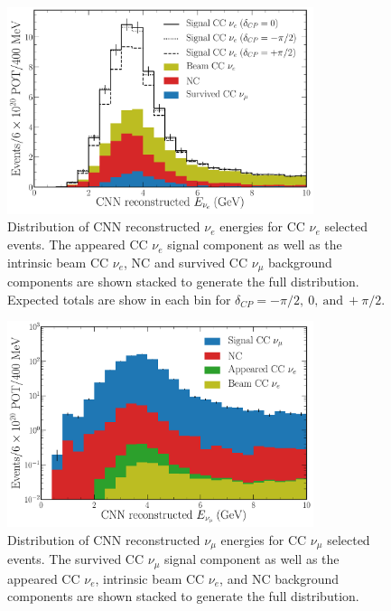 \begin{figure} %
    \includegraphics[width=0.8\textwidth]{diagrams/7-results/final_nuel_passed_energy_dist.pdf}
    \caption[Distribution of CNN reconstructed $\nu_{e}$ energies for CC $\nu_{e}$ selected events]
    {Distribution of CNN reconstructed $\nu_{e}$ energies for CC $\nu_{e}$ selected events. The
        appeared CC $\nu_{e}$ signal component as well as the intrinsic beam CC $\nu_{e}$, NC and
        survived CC $\nu_{\mu}$ background components are shown stacked to generate the full
        distribution. Expected totals are show in each bin for
        $\delta_{CP}=-\pi/2,~0,~\text{and}~+\pi/2$.}
    \label{fig:final_nuel_passed_energy_dist}
\end{figure}

\begin{figure} %
    \includegraphics[width=0.8\textwidth]{diagrams/7-results/final_numu_passed_energy_dist.pdf}
    \caption[Distribution of CNN reconstructed $\nu_{\mu}$ energies for CC $\nu_{\mu}$ selected
        events] {Distribution of CNN reconstructed $\nu_{\mu}$ energies for CC $\nu_{\mu}$
        selected events. The survived CC $\nu_{\mu}$ signal component as well as the appeared CC
        $\nu_{e}$, intrinsic beam CC $\nu_{e}$, and NC background components are shown stacked to
        generate the full distribution.}
    \label{fig:final_numu_passed_energy_dist}
\end{figure}

